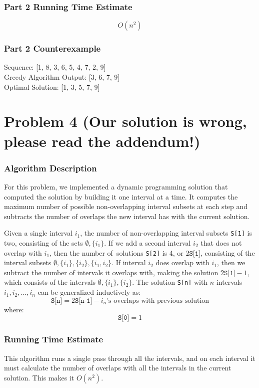 \documentclass{math}
\begin{document}
\subsubsection*{Part 2 Running Time Estimate}
\[ O(n^2) \]

\subsubsection*{Part 2 Counterexample}
Sequence: [1, 8, 3, 6, 5, 4, 7, 2, 9] \\
Greedy Algorithm Output: [3, 6, 7, 9] \\
Optimal Solution: [1, 3, 5, 7, 9]

\section*{Problem 4 (Our solution is wrong, please read the addendum!)}

\subsubsection*{Algorithm Description}
For this problem, we implemented a dynamic programming solution that computed
the solution by building it one interval at a time. It computes the maximum
number of possible non-overlapping interval subsets at each step and subtracts
the number of overlaps the new interval has with the current solution. \par
Given a single interval \( i_1 \), the number of non-overlapping interval
subsets \texttt{S[1]} is two, consisting of the sets \( \emptyset,\{i_1\} \).
If we add a second interval \( i_2 \) that does not overlap with \( i_1 \),
then the number of\ solutions \texttt{S[2]} is 4, or \( 2\texttt{S[1]} \),
consisting of the interval subsets \( \emptyset,\{i_1\},\{i_2\},\{i_1,i_2\} \).
If interval \( i_2 \) does overlap with \( i_1 \), then we subtract the number
of intervals it overlaps with, making the solution \( 2\texttt{S[1]}-1 \), which
consists of the intervals \( \emptyset,\{i_1\},\{i_2\} \). The solution
\texttt{S[n]} with \( n \) intervals \( i_1,i_2,\dots,i_n \) can be
generalized inductively as:
\[ \texttt{S[n]} =
  2\texttt{S[n-1]}-i_n\text{'s overlaps with previous solution} \]
where:
\[ \texttt{S[0]} = 1 \]

\subsubsection*{Running Time Estimate}
This algorithm runs a single pass through all the intervals, and on each
interval it must calculate the number of overlaps with all the intervals in
the current solution. This makes it \( O(n^2) \).
\end{document}
